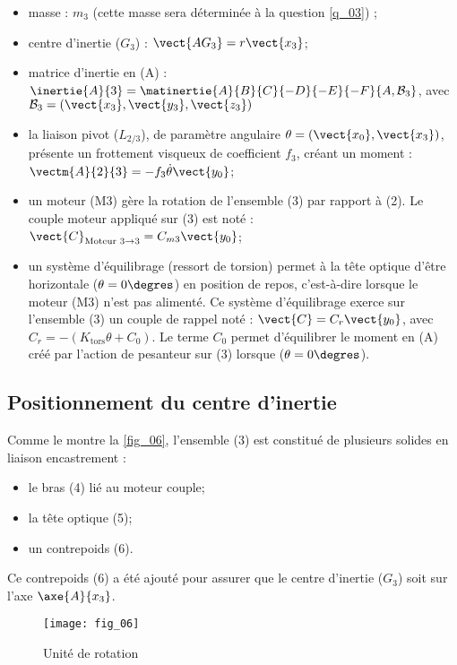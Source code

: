 \begin{itemize}
\begin{itemize}
\item masse : $m_3$ (cette masse sera déterminée à la question \ref{q_03}) ;
\item centre d’inertie ($G_3$) : $\vect{AG_3}=r\vect{x_3}$;
\item matrice d’inertie en (A) : $\inertie{A}{3} = \matinertie{A}{B}{C}{-D}{-E}{-F}{A,\mathcal{B}_3}$, avec $\mathcal{B}_3=\left(\vect{x_3},\vect{y_3},\vect{z_3}\right)$
\item la liaison pivot ($L_{2/3}$), de paramètre angulaire $\theta = \left(\vect{x_0} , \vect{x_3}\right)$, présente un frottement visqueux de coefficient $f_3$, créant un moment : $\vectm{A}{2}{3} = -f_3 \dot{\theta} \vect{y_0}$;
\item un moteur (M3) gère la rotation de l’ensemble (3) par rapport à (2). Le couple moteur appliqué
sur (3) est noté : $\vect{C}_{\text{Moteur 3}\rightarrow 3}=C_{m3}\vect{y_0}$;
\item un système d’équilibrage (ressort de torsion) permet à la tête optique d’être horizontale ($\theta = 0\degres$)
en position de repos, c’est-à-dire lorsque le moteur (M3) n’est pas alimenté. Ce système
d’équilibrage exerce sur l’ensemble (3) un couple de rappel noté : $\vect{C}=C_r \vect{y_0}$, avec
$C_r = -\left(K_{\text{tors}}\theta + C_0\right)$. Le terme $C_0$ permet d’équilibrer le moment en (A) créé par l’action de
pesanteur sur (3) lorsque ($\theta = 0\degres$).
\end{itemize}
\end{itemize}
\fi
\subsection{Positionnement du centre d'inertie}


\ifprof
\else
Comme le montre la \autoref{fig_06}, l’ensemble (3) est constitué de plusieurs solides en liaison encastrement :
\begin{itemize}
\item le bras (4) lié au moteur couple;
\item la tête optique (5);
\item un contrepoids (6).
\end{itemize}
Ce contrepoids (6) a été ajouté pour assurer que le centre d’inertie ($G_3$) soit sur l’axe $\axe{A}{x_3}$.

\begin{figure}[H]
\centering
\texttt{[image: fig\_06]}
\caption{\label{fig_06} Unité de rotation}
\end{figure}


